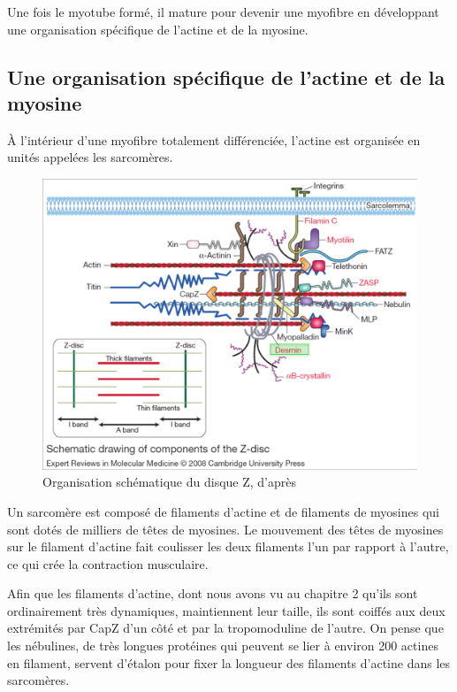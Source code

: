 Une fois le myotube formé, il mature pour devenir une myofibre en développant une organisation spécifique de l'actine et de la myosine.




\subsection{Une organisation spécifique de l'actine et de la myosine }

À l'intérieur d'une myofibre totalement différenciée, l'actine est organisée en unités appelées les sarcomères. 

\begin{figure}
\includegraphics[scale=0.2]{Figures/sarcomere.png} 
\caption{Organisation schématique du disque Z, d'après \cite{ferrer_molecular_2008}}
\end{figure}

Un sarcomère est composé de filaments d'actine et de filaments de myosines qui sont dotés de milliers de têtes de myosines. Le mouvement des têtes de myosines sur le filament d'actine fait coulisser les deux filaments l'un par rapport à l'autre, ce qui crée la contraction musculaire. 

Afin que les filaments d'actine, dont nous avons vu au chapitre 2 qu'ils sont ordinairement très dynamiques, maintiennent leur taille, ils sont coiffés aux deux extrémités par CapZ d'un côté et par la tropomoduline de l'autre.
On pense que les nébulines, de très longues protéines qui peuvent se lier à environ 200 actines en filament, servent d'étalon pour fixer la longueur des filaments d'actine dans les sarcomères. 



